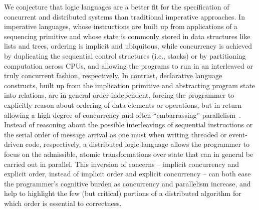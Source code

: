 We conjecture that logic languages are a better fit for the specification of concurrent and distributed systems than traditional imperative approaches.  In imperative languages, whose instructions are built up from applications of a sequencing primitive and whose state is commonly stored in data structures like lists and trees, ordering is implicit and ubiquitous, 
while concurrency is achieved by duplicating the sequential control structures (i.e., stacks)
or by partitioning computation across CPUs,
and allowing the programs to run in an interleaved or truly concurrent fashion, respectively.
In contrast, declarative language constructs, built up from the implication primitive and abstracting program state into relations, are in general order-independent, forcing the programmer to explicitly reason about ordering of data elements or operations,
but in return allowing a high degree of concurrency and often ``embarrassing'' 
parallelism~\cite{podskey}. 
Instead of reasoning about the possible interleavings of sequential
instructions or the serial order of message arrival as one must when writing threaded or 
event-driven code, respectively, a distributed logic language allows the programmer to focus
on the admissible, atomic transformations over state that can in general be carried out in
parallel.  This inversion of concerns -- implicit concurrency and explicit order, instead of
implicit order and explicit concurrency -- can both ease the programmer's cognitive burden as
concurrency and parallelism increase, and help to highlight the few (but critical) 
portions of a distributed algorithm for which order is essential to correctness.


